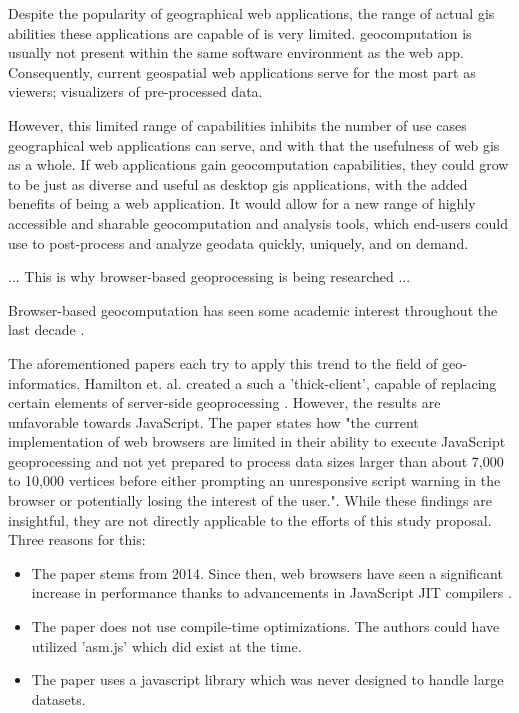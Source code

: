 Despite the popularity of geographical web applications, the range of actual \ac{gis} abilities these applications are capable of is very limited. \ac{geocomputation} is usually not present within the same software environment as the web app. Consequently, current geospatial web applications serve for the most part as viewers; visualizers of pre-processed data. 

However, this limited range of capabilities inhibits the number of use cases geographical web applications can serve, and with that the usefulness of web \ac{gis} as a whole.
If web applications gain \ac{geocomputation} capabilities, they could grow to be just as diverse and useful as desktop \ac{gis} applications, with the added benefits of being a web application. It would allow for a new range of highly accessible and sharable geocomputation and analysis tools, which end-users could use to post-process and analyze geodata quickly, uniquely, and on demand.

... This is why browser-based geoprocessing is being researched ...

Browser-based geocomputation has seen some academic interest throughout the last decade \cite{hamilton_client-side_2014, panidi_hybrid_2015, kulawiak_analysis_2019}.

The aforementioned papers each try to apply this trend to the field of geo-informatics. 
Hamilton et. al. created a such a 'thick-client', capable of replacing certain elements of server-side geoprocessing \cite{hamilton_client-side_2014}. 
However, the results are unfavorable towards JavaScript. 
The paper states how "the current implementation of web browsers are limited in their ability to execute JavaScript geoprocessing and not yet prepared to process data sizes larger than about 7,000 to 10,000 vertices before either prompting an unresponsive script warning in the browser or potentially losing the interest of the user.". While these findings are insightful, they are not directly applicable to the efforts of this study proposal. Three reasons for this:

\begin{itemize}
  \item The paper stems from 2014. Since then, web browsers have seen a significant increase in performance thanks to advancements in JavaScript JIT compilers \cite{haas_bringing_2017, kulawiak_analysis_2019}. 
  \item The paper does not use compile-time optimizations. The authors could have utilized 'asm.js' \cite{mozilla_asmjs_2013} which did exist at the time. 
  \item The paper uses a javascript library which was never designed to handle large datasets.
\end{itemize}

